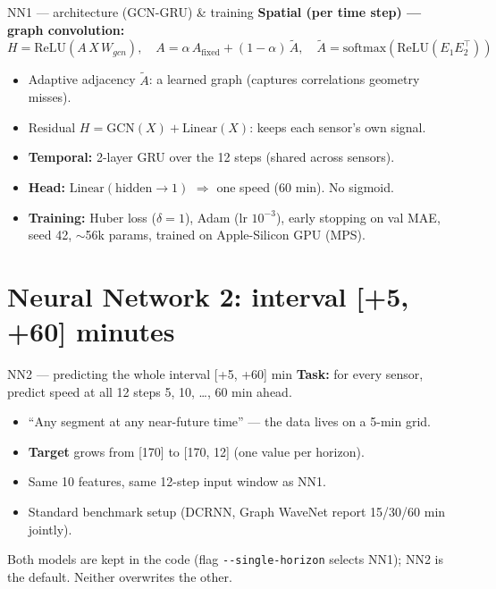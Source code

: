 \documentclass[aspectratio=169]{beamer}
\begin{document}
\begin{frame}{NN1 --- architecture (GCN-GRU) \& training}
  \textbf{Spatial (per time step) --- graph convolution:}
  \[ H = \mathrm{ReLU}(A\,X\,W_{gcn}),\quad
     A = \alpha\,A_{\text{fixed}} + (1-\alpha)\,\tilde A,\quad
     \tilde A = \mathrm{softmax}(\mathrm{ReLU}(E_1 E_2^{\top})) \]
  \begin{itemize}
    \item Adaptive adjacency $\tilde A$: a learned graph (captures correlations geometry misses).
    \item Residual $H = \mathrm{GCN}(X) + \mathrm{Linear}(X)$: keeps each sensor's own signal.
    \item \textbf{Temporal:} 2-layer GRU over the 12 steps (shared across sensors).
    \item \textbf{Head:} $\mathrm{Linear}(\text{hidden}\to 1)$ $\Rightarrow$ one speed (60 min). No sigmoid.
    \item \textbf{Training:} Huber loss ($\delta=1$), Adam (lr $10^{-3}$), early stopping on val MAE,
          seed 42, $\sim$56k params, trained on Apple-Silicon GPU (MPS).
  \end{itemize}
\end{frame}

\section{Neural Network 2: interval [+5, +60] minutes}
\begin{frame}{NN2 --- predicting the whole interval [+5, +60] min}
  \textbf{Task:} for every sensor, predict speed at all 12 steps 5, 10, \dots, 60 min ahead.
  \begin{itemize}
    \item ``Any segment at any near-future time'' --- the data lives on a 5-min grid.
    \item \textbf{Target} grows from [170] to [170, 12] (one value per horizon).
    \item Same 10 features, same 12-step input window as NN1.
    \item Standard benchmark setup (DCRNN, Graph WaveNet report 15/30/60 min jointly).
  \end{itemize}
  \vspace{0.3em}
  Both models are kept in the code (flag \texttt{-{}-single-horizon} selects NN1);
  NN2 is the default. Neither overwrites the other.
\end{frame}
\end{document}
